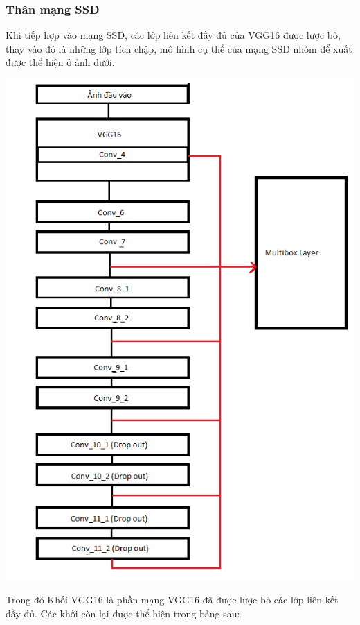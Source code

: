 \documentclass[a4paper,12pt]{article}
\begin{document}
	\subsubsection{Thân mạng SSD}
	
	Khi tiếp hợp vào mạng SSD, các lớp liên kết đầy đủ của VGG16 được lược bỏ, thay vào đó là những lớp tích chập, mô hình cụ thể của mạng SSD nhóm để xuất được thể hiện ở ảnh dưới.
	
	\begin{center}
		
		\centering
		\includegraphics[width=0.8\linewidth]{SSD_Layers.png}
		\vspace{0.5cm}
	\end{center}
	
	Trong đó Khối VGG16 là phần mạng VGG16 đã được lược bỏ các lớp liên kết đầy đủ. Các khối còn lại được thể hiện trong bảng sau:
	
\end{document}
